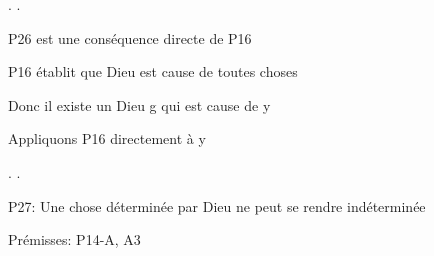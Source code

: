 \documentclass[10pt]{report}
\begin{document}
\begin{coqdoccode}
\coqdocnoindent
{}.\coqdoceol
\coqdocindent{1.00em}
   .\coqdoceol
\coqdocemptyline
\coqdocindent{1.00em}
\begin{coqdoccomment}
\coqdocindent{0.50em}
P26\coqdocindent{0.50em}
est\coqdocindent{0.50em}
une\coqdocindent{0.50em}
conséquence\coqdocindent{0.50em}
directe\coqdocindent{0.50em}
de\coqdocindent{0.50em}
P16\coqdocindent{0.50em}
\end{coqdoccomment}
\coqdoceol
\coqdocindent{1.00em}
\begin{coqdoccomment}
\coqdocindent{0.50em}
P16\coqdocindent{0.50em}
établit\coqdocindent{0.50em}
que\coqdocindent{0.50em}
Dieu\coqdocindent{0.50em}
est\coqdocindent{0.50em}
cause\coqdocindent{0.50em}
de\coqdocindent{0.50em}
toutes\coqdocindent{0.50em}
choses\coqdocindent{0.50em}
\end{coqdoccomment}
\coqdoceol
\coqdocindent{1.00em}
\begin{coqdoccomment}
\coqdocindent{0.50em}
Donc\coqdocindent{0.50em}
il\coqdocindent{0.50em}
existe\coqdocindent{0.50em}
un\coqdocindent{0.50em}
Dieu\coqdocindent{0.50em}
g\coqdocindent{0.50em}
qui\coqdocindent{0.50em}
est\coqdocindent{0.50em}
cause\coqdocindent{0.50em}
de\coqdocindent{0.50em}
y\coqdocindent{0.50em}
\end{coqdoccomment}
\coqdoceol
\coqdocemptyline
\coqdocindent{1.00em}
\begin{coqdoccomment}
\coqdocindent{0.50em}
Appliquons\coqdocindent{0.50em}
P16\coqdocindent{0.50em}
directement\coqdocindent{0.50em}
à\coqdocindent{0.50em}
y\coqdocindent{0.50em}
\end{coqdoccomment}
\coqdoceol
\coqdocindent{1.00em}
 .\coqdoceol
\coqdocnoindent
{}.\coqdoceol
\coqdocemptyline
\coqdocnoindent
\begin{coqdoccomment}
\coqdocindent{0.50em}
P27:\coqdocindent{0.50em}
Une\coqdocindent{0.50em}
chose\coqdocindent{0.50em}
déterminée\coqdocindent{0.50em}
par\coqdocindent{0.50em}
Dieu\coqdocindent{0.50em}
ne\coqdocindent{0.50em}
peut\coqdocindent{0.50em}
se\coqdocindent{0.50em}
rendre\coqdocindent{0.50em}
indéterminée\coqdocindent{0.50em}
\end{coqdoccomment}
\coqdoceol
\coqdocnoindent
\begin{coqdoccomment}
\coqdocindent{0.50em}
Prémisses:\coqdocindent{0.50em}
P14-A,\coqdocindent{0.50em}
A3\coqdocindent{0.50em}
\end{coqdoccomment}
\coqdoceol
\coqdocnoindent

\end{coqdoccode}
\end{document}
